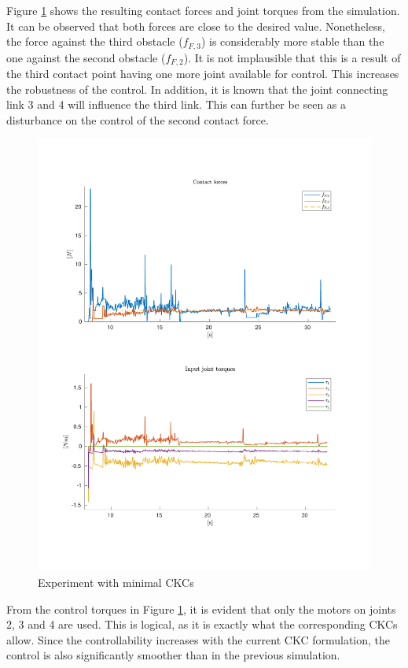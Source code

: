 Figure \ref{fig:2xf-miniJ} shows the resulting contact forces and joint torques from the simulation. It can be observed that both forces are close to the desired value. Nonetheless, the force against the third obstacle ($f_{F,3}$) is considerably more stable than the one against the second obstacle ($f_{F,2}$). It is not implausible that this is a result of the third contact point having one more joint available for control. This increases the robustness of the control. In addition, it is known that the joint connecting link 3 and 4 will influence the third link. This can further be seen as a disturbance on the control of the second contact force.

\begin{figure}
    \centering
    \includegraphics[trim=1.5cm 2cm 2cm 2cm, clip=true, width=\textwidth]{figures/experiments/2xf/miniJ-2plot.pdf}
    \caption{Experiment with minimal CKCs}
    \label{fig:2xf-miniJ}
\end{figure}

From the control torques in Figure \ref{fig:2xf-miniJ}, it is evident that only the motors on joints 2, 3 and 4 are used. This is logical, as it is exactly what the corresponding CKCs allow. Since the controllability increases with the current CKC formulation, the control is also significantly smoother than in the previous simulation.




